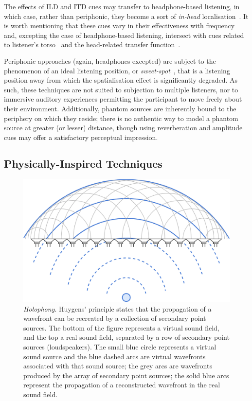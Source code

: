 The effects of ILD and ITD cues may transfer to headphone-based listening,
in which case, rather than periphonic, they become a sort of \textit{in-head}
localisation~\citep{ahrens_analytic_2012}.
It is worth mentioning that these cues vary in their effectiveness with
frequency and, excepting the case of headphone-based listening, intersect with
cues related to listener's torso~\citep{verheijen_sound_1998} and the
head-related transfer
function~\citep{de_poli_physically_1998,geier_object-based_2010}.

Periphonic approaches (again, headphones excepted) are subject to the
phenomenon of an ideal listening position, or
\textit{sweet-spot}~\citep{verheijen_sound_1998,nicol_sound_2017}, that is a
listening position away from which the spatialisation effect is significantly
degraded.
As such, these techniques are not suited to subjection to multiple listeners,
nor to immersive auditory experiences permitting the participant to move freely
about their environment.
Additionally, phantom sources are inherently bound to the periphery on which
they reside;
there is no authentic way to model a phantom source at greater (or lesser)
distance, though using reverberation and amplitude cues may offer a satisfactory
perceptual impression.

\subsection{Physically-Inspired Techniques}\label{subsec:sound-field-synthesis}

\begin{figure}[ht]
    \centering
    \includegraphics[width=.75\textwidth]{figures/wfs_1}
    \caption{\textit{Holophony}.
    Huygens' principle states that the propagation of a wavefront
    can be recreated by a collection of secondary point sources.
    The bottom of the figure represents a virtual sound field, and the top a
    real sound field, separated by a row of secondary point sources
        (loudspeakers).
        The small blue circle represents a virtual sound source and the blue
        dashed arcs are virtual wavefronts associated with that sound source;
        the grey arcs are wavefronts produced by the array of secondary point
        sources;
        the solid blue arcs represent the propagation of a reconstructed
        wavefront in the real sound field.}
    \label{fig:wfs_1}
\end{figure}


